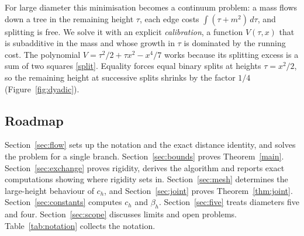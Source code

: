 \documentclass[11pt,a4paper]{article}
\theoremstyle{remark}
\begin{document}
For large diameter this minimisation becomes a continuum problem: a mass flows down a tree in the remaining height $\tau$, each edge costs $\int(\tau+m^2)\,d\tau$, and splitting is free. We solve it with an explicit \emph{calibration}, a function $V(\tau,x)$ that is subadditive in the mass and whose growth in $\tau$ is dominated by the running cost. The polynomial $V=\tau^2/2+\tau x^2-x^4/7$ works because its splitting excess is a sum of two squares \eqref{split}. Equality forces equal binary splits at heights $\tau=x^2/2$, so the remaining height at successive splits shrinks by the factor $1/4$ (Figure~\ref{fig:dyadic}).

\subsection{Roadmap}
Section~\ref{sec:flow} sets up the notation and the exact distance identity, and solves the problem for a single branch. Section~\ref{sec:bounds} proves Theorem~\ref{main}. Section~\ref{sec:exchange} proves rigidity, derives the algorithm and reports exact computations showing where rigidity sets in. Section~\ref{sec:mesh} determines the large-height behaviour of $c_h$, and Section~\ref{sec:joint} proves Theorem~\ref{thm:joint}. Section~\ref{sec:constants} computes $c_h$ and $\beta_h$. Section~\ref{sec:five} treats diameters five and four. Section~\ref{sec:scope} discusses limits and open problems. Table~\ref{tab:notation} collects the notation.
\end{document}
